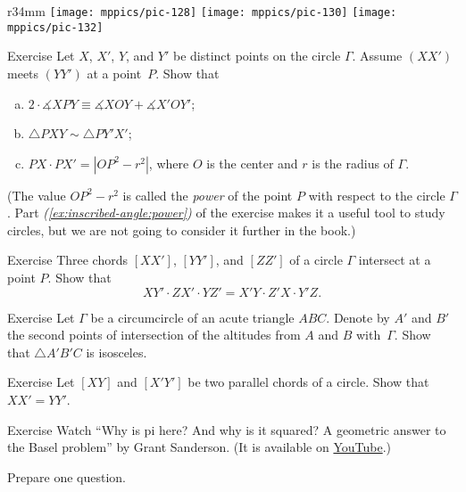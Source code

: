 {

\begin{wrapfigure}{r}{34mm}
\centering
\texttt{[image: mppics/pic-128]}
\vskip3mm
\texttt{[image: mppics/pic-130]}
\vskip3mm
\texttt{[image: mppics/pic-132]}
\end{wrapfigure}

\begin{thm}{Exercise}\label{ex:inscribed-angle}
Let $X$, $X'$, $Y$, and $Y'$ be distinct points on the circle $\Gamma$.
Assume $(XX')$ meets $(YY')$ at a point~$P$.
Show that 
\begin{enumerate}[(a)]
\item $2\cdot \measuredangle XPY\equiv\measuredangle XOY+\measuredangle X'OY'$;
\item\label{ex:inscribed-angle:b} $\triangle PXY\sim \triangle PY'X'$;
\item\label{ex:inscribed-angle:power} $PX\cdot PX'=|OP^2-r^2|$, where $O$ is the center and $r$ is the radius of $\Gamma$.
\end{enumerate}

\end{thm}

(The value $OP^2-r^2$ is called the \emph{power} of the point $P$ with respect to the circle $\Gamma$. 
Part \textit{(\ref{ex:inscribed-angle:power})} of the exercise makes it a useful tool to study circles, but we are not going to consider it further in the book.) 

\begin{thm}{Exercise}\label{ex:inscribed-hex}
Three chords $[XX']$, $[YY']$, and $[ZZ']$
of a circle $\Gamma$ intersect at a point $P$.
Show that 
$$XY'\cdot ZX'\cdot YZ'=X'Y\cdot Z'X\cdot Y'Z.$$

\end{thm}

\begin{thm}{Exercise}\label{ex:altitudes-circumcircle}
Let $\Gamma$ be a circumcircle of an acute triangle $A B C$.
Denote by $A'$ and $B'$ the second points of intersection of the altitudes from $A$ and $B$ with~$\Gamma$.
Show that $\triangle A' B' C$ is isosceles.
\end{thm}

\begin{thm}{Exercise}\label{ex:two-chords}
Let $[XY]$ and $[X'Y']$ be two parallel chords of a circle.
Show that $XX'=YY'$.
\end{thm}

}

\begin{thm}{Exercise}
Watch ``Why is pi here? And why is it squared? A geometric answer to the Basel problem'' by Grant Sanderson. (It is available on \href{https://youtu.be/d-o3eB9sfls}{YouTube}.) 

Prepare one question.
\end{thm}

